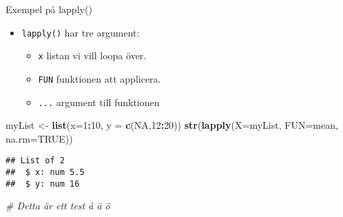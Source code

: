\documentclass[
  11pt,
  ignorenonframetext,
]{beamer}
\newenvironment{Shaded}{\begin{snugshade}}{\end{snugshade}}
\newcommand{\AttributeTok}[1]{\textcolor[rgb]{0.13,0.29,0.53}{#1}}
\newcommand{\CommentTok}[1]{\textcolor[rgb]{0.56,0.35,0.01}{\textit{#1}}}
\newcommand{\ConstantTok}[1]{\textcolor[rgb]{0.56,0.35,0.01}{#1}}
\newcommand{\DecValTok}[1]{\textcolor[rgb]{0.00,0.00,0.81}{#1}}
\newcommand{\FunctionTok}[1]{\textcolor[rgb]{0.13,0.29,0.53}{\textbf{#1}}}
\newcommand{\NormalTok}[1]{#1}
\newcommand{\OtherTok}[1]{\textcolor[rgb]{0.56,0.35,0.01}{#1}}
\newcommand{\SpecialCharTok}[1]{\textcolor[rgb]{0.81,0.36,0.00}{\textbf{#1}}}
\providecommand{\tightlist}{%
  \setlength{\itemsep}{0pt}\setlength{\parskip}{0pt}}
\begin{document}
\begin{frame}[fragile]{Exempel på lapply()}
\label{exempel-puxe5-lapply}
\begin{itemize}
\tightlist
\item
  \texttt{lapply()} har tre argument:

  \begin{itemize}
  \tightlist
  \item
    \texttt{x} listan vi vill loopa över.
  \item
    \texttt{FUN} funktionen att applicera.
  \item
    \texttt{...} argument till funktionen
  \end{itemize}
\end{itemize}

\begin{Shaded}
\begin{Highlighting}[]
\NormalTok{myList }\OtherTok{\textless{}{-}} \FunctionTok{list}\NormalTok{(}\AttributeTok{x=}\DecValTok{1}\SpecialCharTok{:}\DecValTok{10}\NormalTok{, }\AttributeTok{y =} \FunctionTok{c}\NormalTok{(}\ConstantTok{NA}\NormalTok{,}\DecValTok{12}\SpecialCharTok{:}\DecValTok{20}\NormalTok{))}
\FunctionTok{str}\NormalTok{(}\FunctionTok{lapply}\NormalTok{(}\AttributeTok{X=}\NormalTok{myList, }\AttributeTok{FUN=}\NormalTok{mean, }\AttributeTok{na.rm=}\ConstantTok{TRUE}\NormalTok{))}
\end{Highlighting}
\end{Shaded}

\begin{verbatim}
## List of 2
##  $ x: num 5.5
##  $ y: num 16
\end{verbatim}

\begin{Shaded}
\begin{Highlighting}[]
\CommentTok{\# Detta är ett test å ä ö}
\end{Highlighting}
\end{Shaded}
\end{frame}
\end{document}
